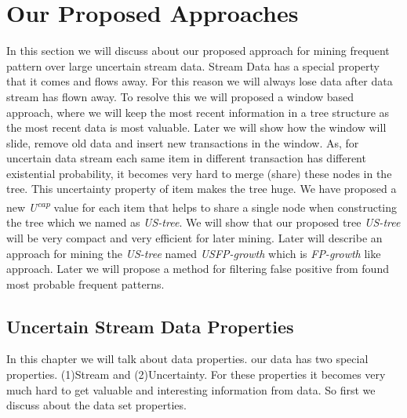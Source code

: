 %

\chapter{Our Proposed Approaches}

In this section we will discuss about our proposed approach for mining frequent pattern over large uncertain stream data. Stream Data has a special property that it comes and flows away. For this reason we will always lose data after data stream has flown away. To resolve this we will proposed a window based approach, where we will keep the most recent information in a tree structure as the most recent data is most valuable. Later we will show how the window will slide, remove old data and insert new transactions in the window. As, for uncertain data stream each same item in different transaction has different existential probability, it becomes very hard to merge (share) these nodes in the tree. This uncertainty property of item makes the tree huge. We have proposed a new \emph{U\textsuperscript{cap}} value for each item that helps to share a single node when constructing the tree which we named as \emph{US-tree}. We will show that our proposed tree \emph{US-tree} will be very compact and very efficient for later mining. Later will describe an approach for mining the \emph {US-tree} named \emph{USFP-growth} which is \emph{FP-growth} like approach. Later we will propose a method for filtering false positive from found most probable frequent patterns.

\section{Uncertain Stream Data Properties}
	In this chapter we will talk about data properties. our data has two special properties. (1)Stream and (2)Uncertainty. For these properties it becomes very much hard to get valuable and interesting information from data. So first we discuss about the data set properties.

